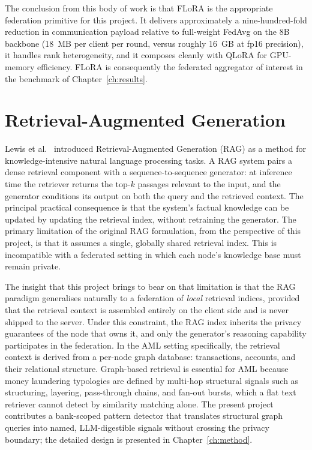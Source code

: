 \documentclass{report}
\begin{document}
The conclusion from this body of work is that FLoRA is the appropriate federation primitive for this project. It delivers approximately a nine-hundred-fold reduction in communication payload relative to full-weight FedAvg on the 8B backbone (18~MB per client per round, versus roughly 16~GB at fp16 precision), it handles rank heterogeneity, and it composes cleanly with QLoRA for GPU-memory efficiency. FLoRA is consequently the federated aggregator of interest in the benchmark of Chapter~\ref{ch:results}.

\section{Retrieval-Augmented Generation}
\label{sec:bg:rag}

Lewis et al.~\cite{lewis2021retrievalaugmentedgenerationknowledgeintensivenlp} introduced Retrieval-Augmented Generation (RAG) as a method for knowledge-intensive natural language processing tasks. A RAG system pairs a dense retrieval component with a sequence-to-sequence generator: at inference time the retriever returns the top-$k$ passages relevant to the input, and the generator conditions its output on both the query and the retrieved context. The principal practical consequence is that the system's factual knowledge can be updated by updating the retrieval index, without retraining the generator. The primary limitation of the original RAG formulation, from the perspective of this project, is that it assumes a single, globally shared retrieval index. This is incompatible with a federated setting in which each node's knowledge base must remain private.

The insight that this project brings to bear on that limitation is that the RAG paradigm generalises naturally to a federation of \textit{local} retrieval indices, provided that the retrieval context is assembled entirely on the client side and is never shipped to the server. Under this constraint, the RAG index inherits the privacy guarantees of the node that owns it, and only the generator's reasoning capability participates in the federation. In the AML setting specifically, the retrieval context is derived from a per-node graph database: transactions, accounts, and their relational structure. Graph-based retrieval is essential for AML because money laundering typologies are defined by multi-hop structural signals such as structuring, layering, pass-through chains, and fan-out bursts, which a flat text retriever cannot detect by similarity matching alone. The present project contributes a bank-scoped pattern detector that translates structural graph queries into named, LLM-digestible signals without crossing the privacy boundary; the detailed design is presented in Chapter~\ref{ch:method}.
\end{document}
